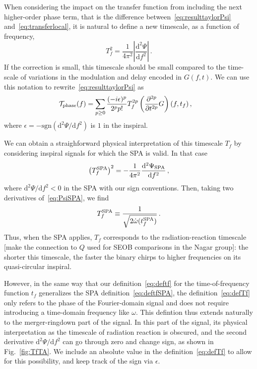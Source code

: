 \documentclass[aps,showpacs,twocolumn,
prd,superscriptaddress,nofootinbib]{revtex4-1}
\newcommand{\be}{\begin{equation}}
\newcommand{\ee}{\end{equation}}
\newcommand\ud{{\mathrm{d}}}
\newcommand\calT{{\mathcal{T}}}
\newcommand{\tf}{t_{f}}
\newcommand{\Tf}{T_{f}}
\newcommand{\tfSPA}{t_{f}^{\rm SPA}}
\newcommand{\SM}[1]{{\color{Red} #1}}
\newcommand{\jgb}[1]{{\color{DarkGreen} #1}}
\begin{document}
\jgb{When considering the impact on the transfer function from including the next higher-order phase term, that is the difference between~\eqref{eq:resulttaylorPsi} and~\eqref{eq:transferlocal}, it is natural to define a new timescale, as a function of frequency,
\be\label{eq:defTf}
	\Tf^{2} = \frac{1}{4\pi^{2}}\left| \frac{\ud^{2}\Psi}{\ud f^{2}} \right| \,.
\ee
If the correction is small, this timescale should be small compared to the time-scale of variations in the modulation and delay encoded in $G(f,t)$.}
We can use this notation to rewrite~\eqref{eq:resulttaylorPsi} as
\begin{align}\label{eq:resultdffPsiTf}
	 \calT_{\rm phase}(f) &= \sum\limits_{p\geq 0} \frac{(-i\epsilon)^{p}}{2^{p}p!} \Tf^{2p} \left( \frac{\partial^{2p} }{\partial t^{2p}} G \right)(f, \tf) \,,
\end{align}
where $\epsilon = -\mathrm{sgn}(\ud^{2}\Psi/\ud f^{2} )$ is $1$ in the inspiral.

We can obtain a straighforward physical interpretation of this timescale $\Tf$ by considering inspiral signals for which the SPA is valid.
\jgb{In that case
\be
	\left(\Tf^{\rm SPA} \right)^{2} = -\frac{1}{4\pi^{2}}  \frac{\ud^{2} \Psi_{\rm SPA}}{\ud f^{2}} \,,
\ee
where $\ud^{2}\Psi/\ud f^{2} < 0$ in the SPA with our sign conventions.
Then, taking two derivatives of~\eqref{eq:PsiSPA}, we find
\be\label{eq:TfSPA}
	\Tf^{\rm SPA} \equiv \frac{1}{\sqrt{2\dot{\omega}(\tfSPA)}} \,.
\ee
Thus, when the SPA applies, $\Tf$ corresponds to} the radiation-reaction timescale \SM{[make the connection to $Q$ used for SEOB comparisons in the Nagar group]}: the shorter this timescale, the faster the binary chirps to higher frequencies on its quasi-circular inspiral. 

However, in the same way that our definition~\eqref{eq:deftf} for the time-of-frequency function $t_{f}$ generalizes the SPA definition~\eqref{eq:deftfSPA}, the definition~\eqref{eq:defTf} only refers to the phase of the Fourier-domain signal and does not require introducing a time-domain frequency like $\omega$. This defintion thus extends naturally to the merger-ringdown part of the signal. In this part of the signal, its physical interpretation as the timescale of radiation reaction is obscured, and the second derivative $\ud^{2}\Psi/\ud f^{2}$ can go through zero and change sign, as shown in Fig.~\ref{fig:TfTA}. We include an absolute value in the definition~\eqref{eq:defTf} to allow for this possibility, and keep track of the sign via $\epsilon$.
\end{document}
